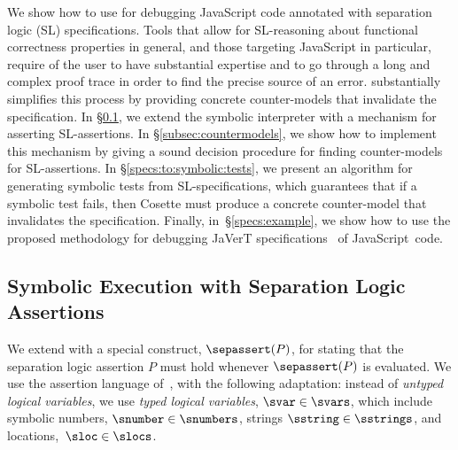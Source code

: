 
We show how to use \cosette for debugging JavaScript code annotated with 
separation logic (SL) specifications. Tools that allow for SL-reasoning about
functional correctness properties in general, and those targeting 
JavaScript in particular, require of the user to have substantial expertise 
and to go through a long and complex proof trace in order to find the precise 
source of an error. \cosette substantially simplifies this process by providing
concrete counter-models that invalidate the specification.
In \S\ref{subsec:sep:assertions}, we extend the 
 \jsil symbolic interpreter with a mechanism for asserting
SL-assertions. 
In \S\ref{subsec:countermodels}, we show how to implement this mechanism by giving a sound decision procedure for finding counter-models 
for SL-assertions.
In \S\ref{specs:to:symbolic:tests}, we present an algorithm  
for generating symbolic tests from SL-specifications, which guarantees 
that if a symbolic test fails, then Cosette must produce a concrete 
counter-model that invalidates 
the specification. Finally, in~\S\ref{specs:example}, we show how to use the 
proposed methodology for debugging JaVerT specifications~\cite{javert} of JavaScript~code. 

\subsection{\jsil Symbolic Execution with Separation Logic Assertions}
\label{subsec:sep:assertions}

We extend \jsil with a special construct, $\sepassert(P)$, for stating that 
the separation logic assertion $P$ must hold whenever $\sepassert(P)$ is evaluated. 
We use the assertion language of~\cite{javert}, with the following adaptation:
instead of \emph{untyped logical variables}, we 
use \emph{typed logical variables}, $\svar \in \svars$, which include 
symbolic numbers, $\snumber \in \snumbers$, strings $\sstring \in \sstrings$, 
and locations,~$\sloc \in \slocs$. 


